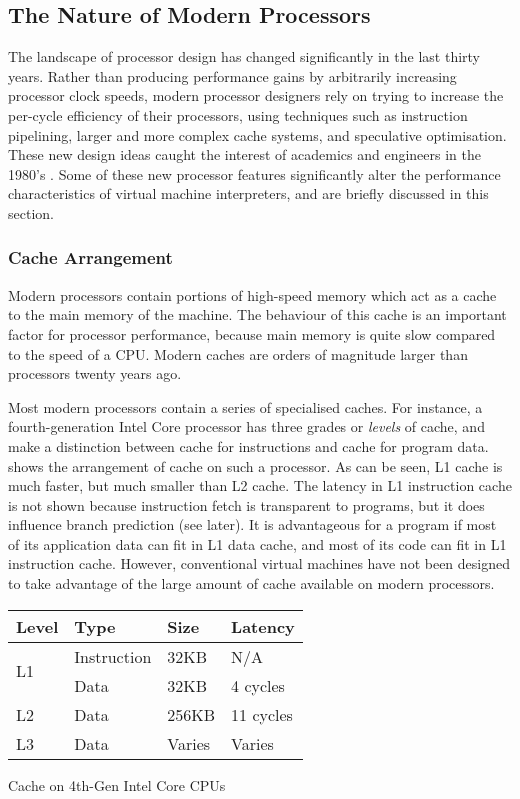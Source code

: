 		\subsection{The Nature of Modern Processors}
			The landscape of processor design has changed significantly in the last thirty years. Rather than producing performance gains by arbitrarily increasing processor clock speeds, modern processor designers rely on trying to increase the per-cycle efficiency of their processors, using techniques such as instruction pipelining, larger and more complex cache systems, and speculative optimisation. These new design ideas caught the interest of academics and engineers in the 1980's \citep{modernprocessordesign}. Some of these new processor features significantly alter the performance characteristics of virtual machine interpreters, and are briefly discussed in this section.
			
			\subsubsection{Cache Arrangement}
			Modern processors contain portions of high-speed memory which act as a cache to the main memory of the machine. The behaviour of this cache is an important factor for processor performance, because main memory is quite slow compared to the speed of a CPU. Modern caches are orders of magnitude larger than processors twenty years ago. 
			
			Most modern processors contain a series of specialised caches. For instance, a fourth-generation Intel Core processor has three grades or \emph{levels} of cache, and make a distinction between cache for instructions and cache for program data.  shows the arrangement of cache on such a processor. As can be seen, L1 cache is much faster, but much smaller than L2 cache. The latency in L1 instruction cache is not shown because instruction fetch is transparent to programs, but it does influence branch prediction (see later). It is advantageous for a program if most of its application data can fit in L1 data cache, and most of its code can fit in L1 instruction cache. However, conventional virtual machines have not been designed to take advantage of the large amount of cache available on modern processors.
			
			\begin{myfigure}
				\begin{tabular}{ | l | l | l | l | }
					\hline
					Level & Type & Size & Latency \\ 
					\hline
					\multirow{2}{*}{L1} & Instruction & 32KB & N/A \\
					& Data & 32KB & 4 cycles \\
					\hline
					L2 & Data & 256KB & 11 cycles \\
					\hline
					L3 & Data & Varies & Varies \\
					\hline
				\end{tabular}
				\caption{Cache on 4th-Gen Intel Core CPUs \citep{optimisationreference}}
				\label{fig:cachenumbers}
			\end{myfigure}
			
